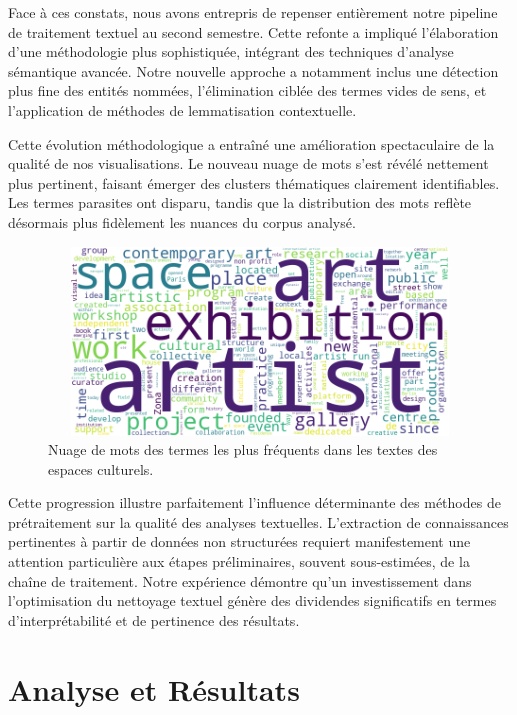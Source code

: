 \documentclass[mstat,12pt]{unswthesis}
\begin{document}
Face à ces constats, nous avons entrepris de repenser entièrement notre pipeline de traitement textuel au second semestre. Cette refonte a impliqué l'élaboration d'une méthodologie plus sophistiquée, intégrant des techniques d'analyse sémantique avancée. Notre nouvelle approche a notamment inclus une détection plus fine des entités nommées, l'élimination ciblée des termes vides de sens, et l'application de méthodes de lemmatisation contextuelle.

Cette évolution méthodologique a entraîné une amélioration spectaculaire de la qualité de nos visualisations. Le nouveau nuage de mots s'est révélé nettement plus pertinent, faisant émerger des clusters thématiques clairement identifiables. Les termes parasites ont disparu, tandis que la distribution des mots reflète désormais plus fidèlement les nuances du corpus analysé.

\begin{figure}[H]
    \centering
    \includegraphics[width=13cm,height=5cm]{word_cloud.png}
    \caption{Nuage de mots des termes les plus fréquents dans les textes des espaces culturels.}
    \label{fig:enquete}
\end{figure}

Cette progression illustre parfaitement l'influence déterminante des méthodes de prétraitement sur la qualité des analyses textuelles. L'extraction de connaissances pertinentes à partir de données non structurées requiert manifestement une attention particulière aux étapes préliminaires, souvent sous-estimées, de la chaîne de traitement. Notre expérience démontre qu'un investissement dans l'optimisation du nettoyage textuel génère des dividendes significatifs en termes d'interprétabilité et de pertinence des résultats.


\hypertarget{analyse-et-ruxe9sultats}{%
\chapter{Analyse et Résultats}\label{analyse-et-ruxe9sultats}}
\end{document}
